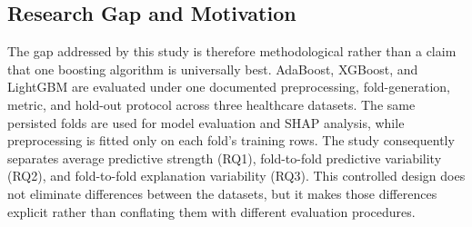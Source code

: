 \subsection{Research Gap and Motivation}
\label{subsec:rw_gap}

The gap addressed by this study is therefore methodological rather than a claim
that one boosting algorithm is universally best. AdaBoost, XGBoost, and LightGBM
are evaluated under one documented preprocessing, fold-generation, metric, and
hold-out protocol across three healthcare datasets. The same persisted folds are
used for model evaluation and SHAP analysis, while preprocessing is fitted only
on each fold's training rows. The study consequently separates average
predictive strength (RQ1), fold-to-fold predictive variability (RQ2), and
fold-to-fold explanation variability (RQ3). This controlled design does not
eliminate differences between the datasets, but it makes those differences
explicit rather than conflating them with different evaluation procedures.
